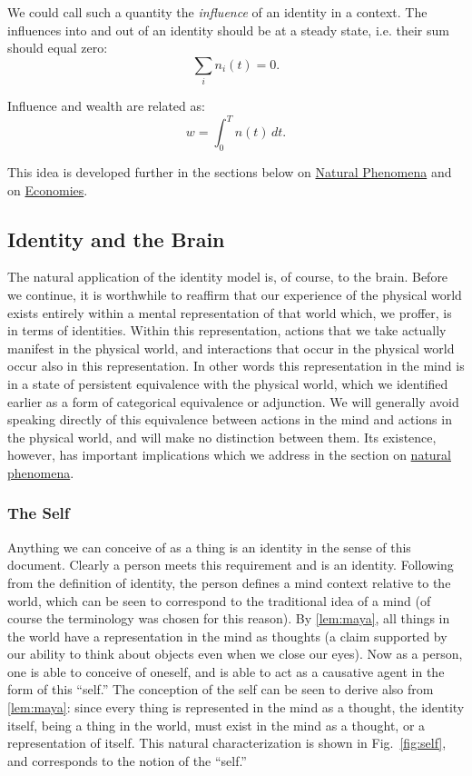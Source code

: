 \documentclass[pra,twocolumn,groupedaddress,10pt]{revtex4}
\theoremstyle{definition}
\begin{document}
We could call such a quantity the \textit{influence} of an identity in a context. The influences into and out of an identity should be at a steady state, i.e. their sum should equal zero:
\begin{equation}
	\sum_{i} n_i(t) = 0 .
\end{equation}

Influence and wealth are related as:
\begin{equation}
	w = \! \int_{0}^{T} n(t)\,dt \label{eq:influence}.
\end{equation}

This idea is developed further in the sections below on \hyperref[sec:natphe]{Natural Phenomena} and on \hyperref[sec:ecogovintpro]{Economies}.

\subsection{Identity and the Brain} \label{sec:idebra}

The natural application of the identity model is, of course, to the brain. Before we continue, it is worthwhile to reaffirm that our experience of the physical world exists entirely within a mental representation of that world which, we proffer, is in terms of identities. Within this representation, actions that we take actually manifest in the physical world, and interactions that occur in the physical world occur also in this representation. In other words this representation in the mind is in a state of persistent equivalence with the physical world, which we identified earlier as a form of categorical equivalence or adjunction. We will generally avoid speaking directly of this equivalence between actions in the mind and actions in the physical world, and will make no distinction between them. Its existence, however, has important implications which we address in the section on \hyperref[sec:natphe]{natural phenomena}.

\subsubsection{The Self} \label{sec:theself}

Anything we can conceive of as a thing is an identity in the sense of this document. Clearly a person meets this requirement and is an identity. Following from the definition of identity, the person defines a mind context relative to the world, which can be seen to correspond to the traditional idea of a mind (of course the terminology was chosen for this reason). By \autoref{lem:maya}, all things in the world have a representation in the mind as thoughts (a claim supported by our ability to think about objects even when we close our eyes). Now as a person, one is able to conceive of oneself, and is able to act as a causative agent in the form of this ``self.'' The conception of the self can be seen to derive also from \autoref{lem:maya}: since every thing is represented in the mind as a thought, the identity itself, being a thing in the world, must exist in the mind as a thought, or a representation of itself. This natural characterization is shown in Fig.~\ref{fig:self}, and corresponds to the notion of the ``self.''
\end{document}
